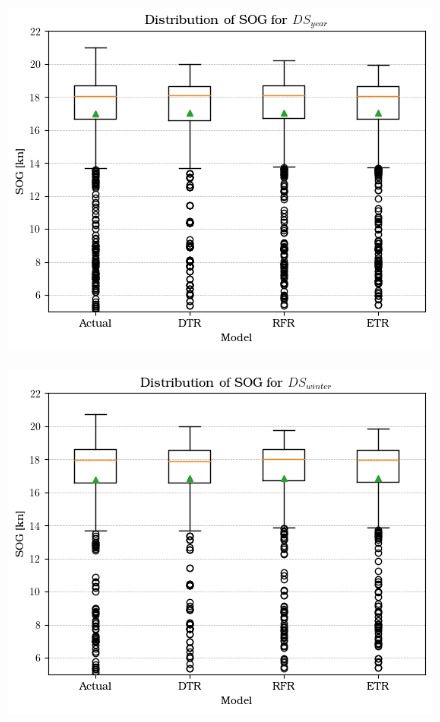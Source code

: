 \begin{figure}[ht]
\centering

\begin{minipage}[b]{0.32\textwidth}
    \centering
    \includegraphics[width=\textwidth]{02_figures/sog_pred_year.png}
    \label{fig:boxplot_dsyear}
\end{minipage}%
\hfill
\begin{minipage}[b]{0.32\textwidth}
    \centering
    \includegraphics[width=\textwidth]{02_figures/sog_pred_winter.png}

\end{minipage}
\end{figure}

